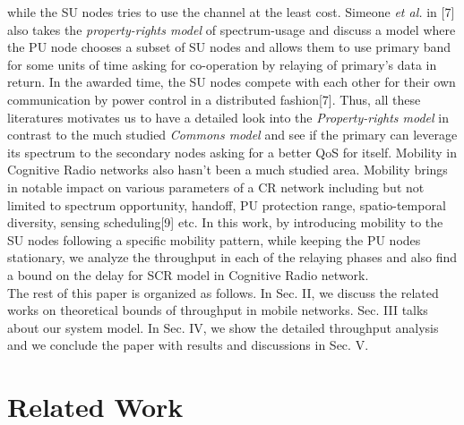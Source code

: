 \documentclass[conference]{IEEEtran}
\begin{document}
while the SU nodes tries to use the channel at the least cost. Simeone \emph{et al.} in [7] also takes the \textit{property-rights model} 
of spectrum-usage and discuss a model where the PU node chooses a subset of SU nodes and allows them to use primary band for some 
units of time asking for co-operation by relaying of primary's data in return. In the awarded time, the SU nodes compete with each 
other for their own communication by power control in a distributed fashion[7]. Thus, all these literatures motivates us to have a detailed look into the 
\textit{Property-rights model} in contrast to the much studied \textit{Commons model} and see if the primary can leverage its 
spectrum to the secondary nodes asking for a better QoS for itself. Mobility in Cognitive Radio networks also hasn't been a much studied area. Mobility brings in notable impact on various 
parameters of a CR network including but not limited to spectrum opportunity, handoff, PU protection range, spatio-temporal diversity, sensing scheduling[9] etc. In this work, by introducing
 mobility to the SU nodes following a specific mobility pattern, while keeping the PU nodes stationary, we analyze the throughput in each of the relaying phases and also find a bound on the delay 
for SCR model in Cognitive Radio network.\\
The rest of this paper is organized as follows. In Sec. II, we discuss the related works on theoretical bounds of throughput in mobile networks. Sec. III talks about our system model. In Sec. IV, 
we show the detailed throughput analysis and we conclude the paper with results and discussions in Sec. V.  

\section{Related Work}
\end{document}
